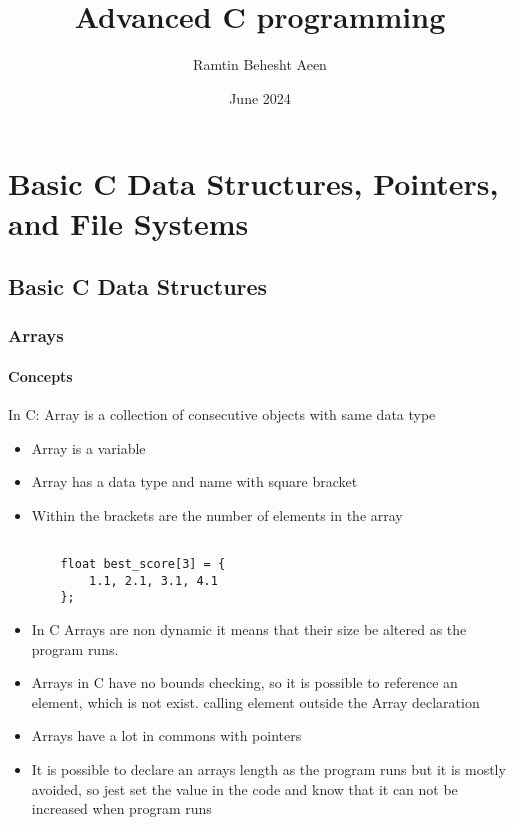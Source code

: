 \documentclass{book}
\title{Advanced C programming}
\author{Ramtin Behesht Aeen}
\date{June 2024}
\begin{document}
\maketitle

\part{ Basic C Data Structures, Pointers, and File Systems}
\chapter{Basic C Data Structures}

\section{Arrays}
\subsection{Concepts}

In C: Array is a collection of consecutive objects with same data type
\begin{itemize}
    \item Array is a variable
    \item Array has a data type and name with square bracket
    \item Within the brackets are the number of elements in the array


    \begin{lstlisting}
        
    float best_score[3] = {
        1.1, 2.1, 3.1, 4.1
    };

    \end{lstlisting}

    \item In C Arrays are non dynamic it means that their size be altered as the program runs.
    \item Arrays in C have no bounds checking, so it is possible to reference an element, which is not exist. calling element outside the Array declaration
    \item Arrays have a lot in commons with pointers
    \item It is possible to declare an arrays length as the program runs but it is mostly avoided, so jest set the value in the code and know that it can not be increased when program runs
    \end{itemize}
    \break
    \break
    
\end{document}

